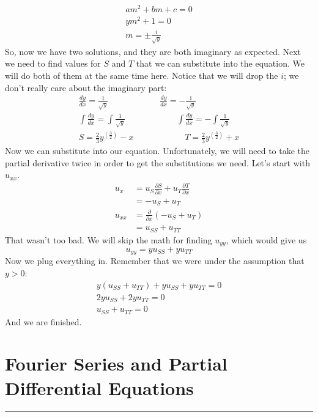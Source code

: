 \documentclass{article}
\begin{document}
\begin{gather*}
am^{2} + bm + c = 0\\
ym^{2} + 1 = 0\\
m = \pm \frac{i}{\sqrt{y}}
\end{gather*}
\noindent So, now we have two solutions, and they are both imaginary as expected. Next we need to find values for $S$ and $T$ that we can substitute into the equation. We will do both of them at the same time here. Notice that we will drop the $i$; we don't really care about the imaginary part:
\begin{gather*}
\frac{dy}{dx} = \frac{1}{\sqrt{y}} \qquad\qquad\qquad \frac{dy}{dx} = -\frac{1}{\sqrt{y}}\\
\int\frac{dy}{dx} =\int\frac{1}{\sqrt{y}} \qquad\qquad\qquad \int\frac{dy}{dx} = -\int\frac{1}{\sqrt{y}}\\
S = \frac{2}{3}y^{\left(\frac{3}{2}\right)} - x \qquad\qquad\qquad T = \frac{2}{3}y^{\left(\frac{3}{2}\right)} + x
\end{gather*}
\noindent Now we can substitute into our equation. Unfortunately, we will need to take the partial derivative twice in order to get the substitutions we need. Let's start with $u_{xx}$.
\begin{align*}
u_{x} &= u_{S}\frac{\partial S}{\partial x} + u_{T}\frac{\partial T}{\partial x}\\
&= -u_{S} + u_{T}\\
u_{xx} &= \frac{\partial}{\partial x}(-u_{S} + u_{T})\\
&= u_{SS} + u_{TT}
\end{align*}
\noindent That wasn't too bad. We will skip the math for finding $u_{yy}$, which would give us
\[
u_{yy} = yu_{SS} + yu_{TT}
\]
\noindent Now we plug everything in. Remember that we were under the assumption that $y > 0$:
\begin{gather*}
y(u_{SS} + u_{TT}) + yu_{SS} + yu_{TT} = 0\\
2yu_{SS} + 2yu_{TT} = 0\\
u_{SS} + u_{TT} = 0
\end{gather*}
\noindent And we are finished.


\newpage
\section{Fourier Series and Partial Differential Equations}
\hrule
\noindent\\
\end{document}
